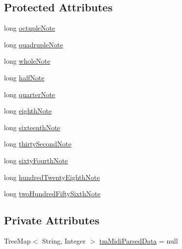 \subsection*{Protected Attributes}
\begin{DoxyCompactItemize}
\item 
long \hyperlink{classcom_1_1lclion_1_1midiparser_1_1_note_value_a0fe4156c4e159f9a31683a59b06c1213}{octuple\+Note}
\item 
long \hyperlink{classcom_1_1lclion_1_1midiparser_1_1_note_value_ac77da61f39c85c427dda26cedd8d4f33}{quadruple\+Note}
\item 
long \hyperlink{classcom_1_1lclion_1_1midiparser_1_1_note_value_a2c13de9bc725e5050477c6b6dd2c2685}{whole\+Note}
\item 
long \hyperlink{classcom_1_1lclion_1_1midiparser_1_1_note_value_a9ec6410d8fdb73fe7b7f8ac085143899}{half\+Note}
\item 
long \hyperlink{classcom_1_1lclion_1_1midiparser_1_1_note_value_ae639274224563b363fe8dc556cbbce62}{quarter\+Note}
\item 
long \hyperlink{classcom_1_1lclion_1_1midiparser_1_1_note_value_a9e3dcd56ee8c1ab5bdcaa8fbb9288ba0}{eighth\+Note}
\item 
long \hyperlink{classcom_1_1lclion_1_1midiparser_1_1_note_value_af0442d9703406792637f35a3c4e2b130}{sixteenth\+Note}
\item 
long \hyperlink{classcom_1_1lclion_1_1midiparser_1_1_note_value_a2a933c01f9e22c17ce9a40d63a33f946}{thirty\+Second\+Note}
\item 
long \hyperlink{classcom_1_1lclion_1_1midiparser_1_1_note_value_aff6ebf47b5381550caaffc00fa985919}{sixty\+Fourth\+Note}
\item 
long \hyperlink{classcom_1_1lclion_1_1midiparser_1_1_note_value_a317ae100aa1c03b9c81ba01bd2f21e10}{hundred\+Twenty\+Eighth\+Note}
\item 
long \hyperlink{classcom_1_1lclion_1_1midiparser_1_1_note_value_a4a95369850429cf5d1cc019b0a88ae04}{two\+Hundred\+Fifty\+Sixth\+Note}
\end{DoxyCompactItemize}
\subsection*{Private Attributes}
\begin{DoxyCompactItemize}
\item 
Tree\+Map$<$ String, Integer $>$ \hyperlink{classcom_1_1lclion_1_1midiparser_1_1_note_value_a2c45af85892bf1a0526df4c6d66a27b7}{tm\+Midi\+Parsed\+Data} = null
\end{DoxyCompactItemize}


